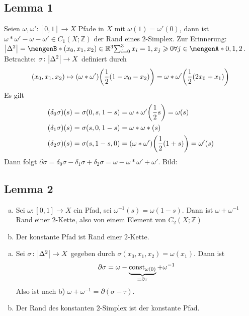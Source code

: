 \subsection{Lemma 1} %
\label{sub:156}
Seien $\omega,\omega' \colon [0,1] \to X$ Pfade in $X$ mit $\omega(1)=\omega'(0)$, dann ist $\omega * \omega' - \omega- \omega' \in C_1(X;\mathds{Z})$ der Rand eines 
$2$-Simplex.
Zur Erinnerung: $\abs*{\Delta^2} = \set[(x_0,x_1,x_2) \in \mathds{R}^3]{\sum_{i=0}^{3}x_i=1, x_j \ge 0 \forall j \in \set{0,1,2}}$. Betrachte: 
$\sigma \colon \abs*{\Delta^2}  \to X$ definiert durch 
\[
	(x_0,x_1,x_2) \mapsto(\omega*\omega') \enbrace*{\frac{1}{2} (1-x_0-x_2)} = \omega * \omega' \enbrace*{\frac{1}{2}(2x_0 + x_1) }  
\]
Es gilt 
\begin{align*}
	(\delta_0 \sigma)(s) &= \sigma(0,s,1-s) = \omega * \omega' \enbrace*{\frac{1}{2} s}=\omega(s) \\
	(\delta_1 \sigma)(s) &= \sigma(s, 0, 1-s) = \omega * \omega*(s) \\
	(\delta_2 \sigma)(s) &= \sigma(s,1-s,0) = (\omega * \omega') \enbrace*{\frac{1}{2} (1+s)} = \omega'(s)
\end{align*}
Dann folgt $\partial \sigma = \delta_0 \sigma - \delta_1 \sigma + \delta_2 \sigma = \omega - \omega * \omega' + \omega'$. Bild: \bewende
{} 

\subsection{Lemma 2} %
\label{sub:157}
\begin{enumerate}[a)]
	\item Sei $\omega \colon [0,1] \to X$ ein Pfad, sei $\omega ^{-1}(s) = \omega(1-s)$. Dann ist $\omega + \omega ^{-1}$ Rand einer $2$-Kette, also von einem Element von
	$C_2(X;\mathds{Z})$
	\item Der konstante Pfad ist Rand einer $2$-Kette.
\end{enumerate}
\begin{enumerate}[a)]
	\item Sei $\sigma \colon \abs*{\Delta^2} \to X$ gegeben durch $\sigma(x_0,x_1,x_2) = \omega(x_1)$. Dann ist 
	\[
		\partial \sigma = \omega- \underbrace{\mathrm{const}_{\omega(0)}}_{=\partial \tau} + \omega ^{-1}
	\]
	Also ist nach b) $\omega + \omega ^{-1} = \partial(\sigma-\tau)$.
	\item Der Rand des konstanten $2$-Simplex ist der konstante Pfad. \bewende
\end{enumerate}

